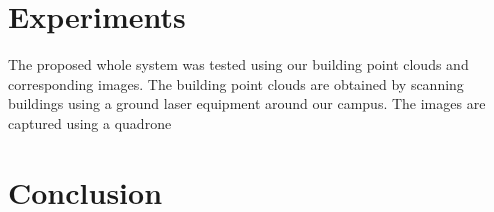 \section{Experiments}
%
The proposed whole system was tested using our building point clouds and corresponding images. The building point clouds are obtained by scanning buildings using a ground laser equipment around our campus. The images are captured using a quadrone
\section{Conclusion}
